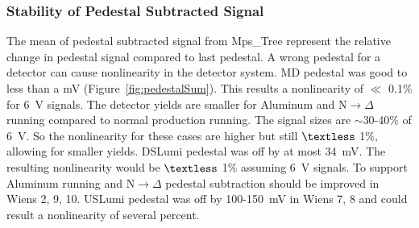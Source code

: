 \subsubsection{Stability of Pedestal Subtracted Signal}
\label{Stability of Pedestal Subtracted Signal}
The mean of pedestal subtracted signal from Mps\_Tree represent the relative change in pedestal signal compared to last pedestal. A wrong pedestal for a detector can cause nonlinearity in the detector system. MD pedestal was good to less than a mV (Figure~\ref{fig:pedestalSum}). This results a nonlinearity of $\ll$ 0.1\% for 6~V signals. The detector yields are smaller for Aluminum and N$\rightarrow\Delta$ running compared to normal production running. The signal sizes are $\sim$30-40\% of 6~V. So the nonlinearity for these cases are higher but still $\textless$ 1\%, allowing for smaller yields. DSLumi pedestal was off by at most 34~mV. The resulting nonlinearity would be $\textless$ 1$\%$ assuming 6~V signals. To support Aluminum running and N$\rightarrow\Delta$ pedestal subtraction should be improved in Wiens 2, 9, 10.  USLumi pedestal was off by 100-150~mV in Wiens 7, 8 and could result a nonlinearity of several percent.



